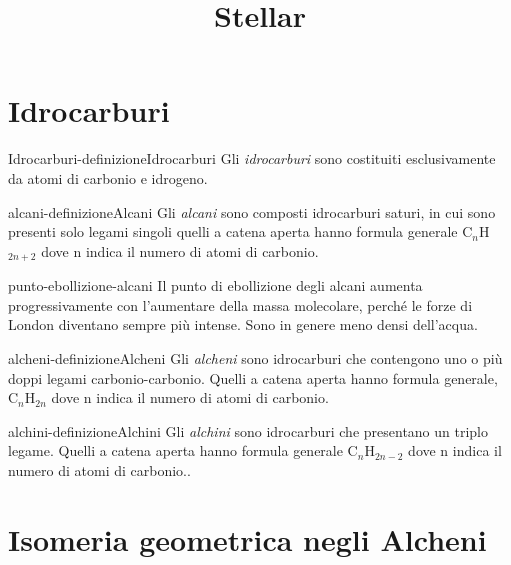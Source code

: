 \documentclass[preview]{standalone}
\begin{document}
\title{Stellar}
\genpage

\section{Idrocarburi}

\begin{snippetdefinition}{Idrocarburi-definizione}{Idrocarburi}
    Gli \textit{idrocarburi} sono costituiti esclusivamente da atomi di
    carbonio e idrogeno.
\end{snippetdefinition}

\begin{snippetdefinition}{alcani-definizione}{Alcani}
    Gli \textit{alcani} sono composti idrocarburi saturi, in cui sono presenti solo
    legami singoli quelli a catena aperta hanno formula generale
    C\({}_n\)H\({}_{2n+2}\) dove n indica il numero di atomi di carbonio.
\end{snippetdefinition}

\begin{snippet}{punto-ebollizione-alcani}
    Il punto di ebollizione degli alcani aumenta progressivamente con
    l'aumentare della massa molecolare, perché le forze di London
    diventano sempre più intense. Sono in genere meno densi
    dell'acqua.
\end{snippet}

\begin{snippetdefinition}{alcheni-definizione}{Alcheni}
    Gli \textit{alcheni} sono idrocarburi che contengono uno o più doppi
    legami carbonio-carbonio.
    Quelli a catena aperta hanno formula generale, C\({}_n\)H\({}_{2n}\)
    dove n indica il numero di atomi di carbonio.
\end{snippetdefinition}

\begin{snippetdefinition}{alchini-definizione}{Alchini}
    Gli \textit{alchini} sono idrocarburi che presentano un triplo legame. Quelli a catena
    aperta hanno formula generale C\({}_n\)H\({}_{2n-2}\)
    dove n indica il numero di atomi di carbonio.. 
\end{snippetdefinition}


\section{Isomeria geometrica negli Alcheni}
\end{document}
